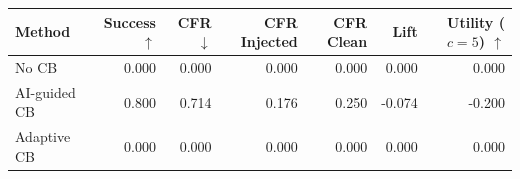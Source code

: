 \begin{tabular}{lrrrrrr}
\toprule
Method & Success $\uparrow$ & CFR $\downarrow$ & CFR Injected & CFR Clean & Lift & Utility ($c=5$) $\uparrow$ \\
\midrule
No CB & 0.000 & 0.000 & 0.000 & 0.000 & 0.000 & 0.000 \\
AI-guided CB & 0.800 & 0.714 & 0.176 & 0.250 & -0.074 & -0.200 \\
Adaptive CB & 0.000 & 0.000 & 0.000 & 0.000 & 0.000 & 0.000 \\
\bottomrule
\end{tabular}
